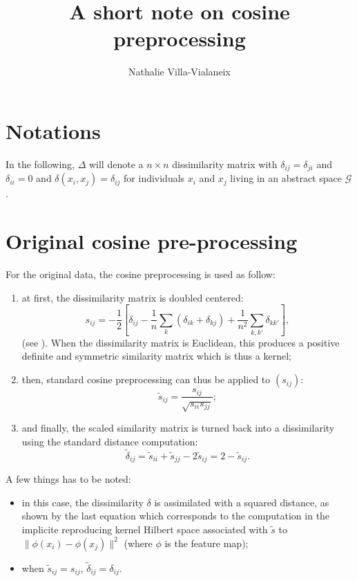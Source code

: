 \documentclass[a4paper,10pt]{scrartcl}
\title{A short note on cosine preprocessing}
\author{Nathalie Villa-Vialaneix}
\begin{document}
\sloppy
\maketitle

\section{Notations}

In the following, $\Delta$ will denote a $n\times n$ dissimilarity matrix with
$\delta_{ij}=\delta_{ji}$ and $\delta_{ii}=0$ and $\delta(x_i,x_j)=\delta_{ij}$
for individuals $x_i$ and $x_j$ living in an abstract space $\mathcal{G}$.

\section{Original cosine pre-processing}

For the original data, the cosine preprocessing is used as follow:
\begin{enumerate}
	\item at first, the dissimilarity matrix is doubled centered:
	\[
		s_{ij} = -\frac{1}{2} \left[\delta_{ij} -\frac{1}{n} \sum_k
\left(\delta_{ik}+\delta_{kj}\right) + \frac{1}{n^2} \sum_{k,k'}
\delta_{kk'}\right],
	\]
	(see \cite{lee_verleysen_NDR2007}). When the dissimilarity matrix is
Euclidean, this produces a positive definite and symmetric similarity matrix
which is thus a kernel;
	\item then, standard cosine preprocessing \cite{benhur_weston_DMTLS2010} can
thus be applied to $(s_{ij})$:
	\[
		\tilde{s}_{ij} = \frac{s_{ij}}{\sqrt{s_{ii}s_{jj}}};
	\]
	\item and finally, the scaled similarity matrix is turned back into a
dissimilarity using the standard distance computation:
	\[
		\tilde{\delta}_{ij} = \tilde{s}_{ii} + \tilde{s}_{jj} - 2\tilde{s}_{ij} =
2-\tilde{s}_{ij}.
	\]
\end{enumerate}

A few things has to be noted:
\begin{itemize}
	\item in this case, the dissimilarity $\delta$ is assimilated with a squared
distance, as shown by the last equation which corresponds to the computation in
the implicite reproducing kernel Hilbert space associated with $\tilde{s}$ to
$\|\phi(x_i)-\phi(x_j)\|^2$ (where $\phi$ is the feature map);
	\item when $\tilde{s}_{ij}=s_{ij}$, $\tilde{\delta}_{ij}=\delta_{ij}$.
\end{itemize}
\end{document}
